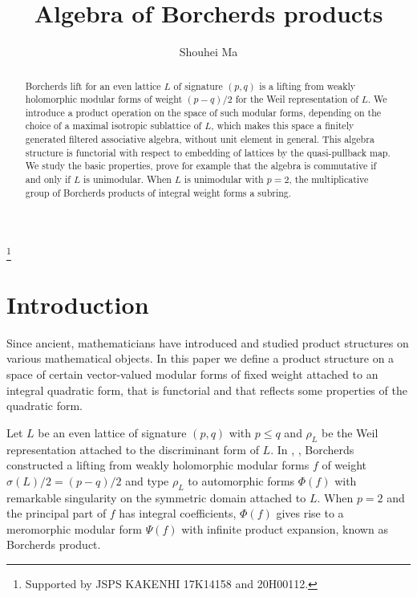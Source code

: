\documentclass[12pt]{amsart}
\numberwithin{equation}{section}
\theoremstyle{definition}
\theoremstyle{remark}
\begin{document}
\title[]{Algebra of Borcherds products}
\author[]{Shouhei Ma}
\thanks{Supported by JSPS KAKENHI 17K14158 and 20H00112.} 
\address{Department~of~Mathematics, Tokyo~Institute~of~Technology, Tokyo 152-8551, Japan}
\maketitle

\begin{abstract}
Borcherds lift for an even lattice $L$ of signature $(p, q)$ is 
a lifting from weakly holomorphic modular forms of 
weight $(p-q)/2$ for the Weil representation of $L$. 
We introduce a product operation on the space of such modular forms, 
depending on the choice of a maximal isotropic sublattice of $L$,  
which makes this space a finitely generated filtered associative algebra, without unit element in general. 
This algebra structure is functorial with respect to embedding of lattices by the quasi-pullback map. 
We study the basic properties, 
prove for example that 
the algebra is commutative if and only if $L$ is unimodular. 
When $L$ is unimodular with $p=2$, 
the multiplicative group of Borcherds products of integral weight 
forms a subring. 
\end{abstract} 



\section{Introduction}

Since ancient, mathematicians have introduced and studied product structures 
on various mathematical objects. 
In this paper we define a product structure on a space of 
certain vector-valued modular forms of fixed weight attached to an integral quadratic form, 
that is functorial and that reflects some properties of the quadratic form. 

Let $L$ be an even lattice of signature $(p, q)$ with $p\leq q$ and  
$\rho_{L}$ be the Weil representation attached to the discriminant form of $L$. 
In \cite{Bo95}, \cite{Bo98}, Borcherds constructed a lifting from 
weakly holomorphic modular forms $f$ of weight $\sigma(L)/2=(p-q)/2$ and type $\rho_{L}$ 
to automorphic forms $\Phi(f)$ with remarkable singularity on the symmetric domain attached to $L$. 
When $p=2$ and the principal part of $f$ has integral coefficients, 
$\Phi(f)$ gives rise to a meromorphic modular form $\Psi(f)$ with infinite product expansion, 
known as Borcherds product. 
\end{document}
